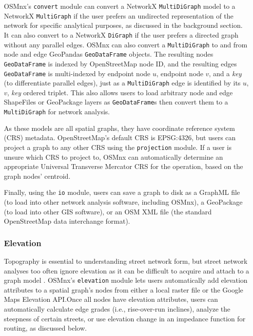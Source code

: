 \documentclass[12pt,letterpaper]{article} %
\begin{document}
OSMnx's \texttt{convert} module can convert a NetworkX \texttt{MultiDiGraph} model to a NetworkX \texttt{MultiGraph} if the user prefers an undirected representation of the network for specific analytical purposes, as discussed in the background section. It can also convert to a NetworkX \texttt{DiGraph} if the user prefers a directed graph without any parallel edges. OSMnx can also convert a \texttt{MultiDiGraph} to and from node and edge GeoPandas \texttt{GeoDataFrame} objects. The resulting nodes \texttt{GeoDataFrame} is indexed by OpenStreetMap node ID, and the resulting edges \texttt{GeoDataFrame} is multi-indexed by endpoint node $u$, endpoint node $v$, and a \textit{key} (to differentiate parallel edges), just as a \texttt{MultiDiGraph} edge is identified by its $u$, $v$, \textit{key} ordered triplet. This also allows users to load arbitrary node and edge ShapeFiles or GeoPackage layers as \texttt{GeoDataFrame}s then convert them to a \texttt{MultiDiGraph} for network analysis.

As these models are all spatial graphs, they have coordinate reference system (CRS) metadata. OpenStreetMap's default CRS is EPSG:4326, but users can project a graph to any other CRS using the \texttt{projection} module. If a user is unsure which CRS to project to, OSMnx can automatically determine an appropriate Universal Transverse Mercator CRS for the operation, based on the graph nodes' centroid.

Finally, using the \texttt{io} module, users can save a graph to disk as a GraphML file (to load into other network analysis software, including OSMnx), a GeoPackage (to load into other GIS software), or an OSM XML file (the standard OpenStreetMap data interchange format).

\subsubsection{Elevation}

Topography is essential to understanding street network form, but street network analyses too often ignore elevation as it can be difficult to acquire and attach to a graph model \citep{boeing_street_2022}. OSMnx's \texttt{elevation} module lets users automatically add elevation attributes to a spatial graph's nodes from either a local raster file or the Google Maps Elevation API.\@ Once all nodes have elevation attributes, users can automatically calculate edge grades (i.e., rise-over-run inclines), analyze the steepness of certain streets, or use elevation change in an impedance function for routing, as discussed below.
\end{document}
